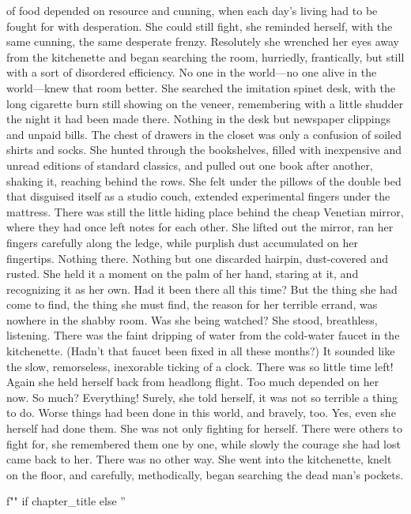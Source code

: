 \documentclass{novel}
\begin{document}
of food depended on resource and cunning, when each day’s living had to be fought for with desperation. She could still fight, she reminded herself, with the same cunning, the same desperate frenzy. Resolutely she wrenched her eyes away from the kitchenette and began searching the room, hurriedly, frantically, but still with a sort of disordered efficiency. No one in the world—no one alive in the world—knew that room better. She searched the imitation spinet desk, with the long cigarette burn still showing on the veneer, remembering with a little shudder the night it had been made there. Nothing in the desk but newspaper clippings and unpaid bills. The chest of drawers in the closet was only a confusion of soiled shirts and socks. She hunted through the bookshelves, filled with inexpensive and unread editions of standard classics, and pulled out one book after another, shaking it, reaching behind the rows. She felt under the pillows of the double bed that disguised itself as a studio couch, extended experimental fingers under the mattress. There was still the little hiding place behind the cheap Venetian mirror, where they had once left notes for each other. She lifted out the mirror, ran her fingers carefully along the ledge, while purplish dust accumulated on her fingertips. Nothing there. Nothing but one discarded hairpin, dust-covered and rusted. She held it a moment on the palm of her hand, staring at it, and recognizing it as her own. Had it been there all this time? But the thing she had come to find, the thing she must find, the reason for her terrible errand, was nowhere in the shabby room. Was she being watched? She stood, breathless, listening. There was the faint dripping of water from the cold-water faucet in the kitchenette. (Hadn’t that faucet been fixed in all these months?) It sounded like the slow, remorseless, inexorable ticking of a clock. There was so little time left! Again she held herself back from headlong flight. Too much depended on her now. So much? Everything! Surely, she told herself, it was not so terrible a thing to do. Worse things had been done in this world, and bravely, too. Yes, even she herself had done them. She was not only fighting for herself. There were others to fight for, she remembered them one by one, while slowly the courage she had lost came back to her. There was no other way. She went into the kitchenette, knelt on the floor, and carefully, methodically, began searching the dead man’s pockets.

\begin{ChapterStart}
\vspace{3\nbs}
f"" if chapter_title else ''
\end{ChapterStart}
\end{document}
